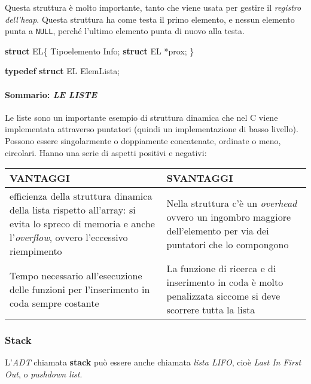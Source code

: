 \documentclass[
]{article}
\newenvironment{Shaded}{}{}
\newcommand{\KeywordTok}[1]{\textcolor[rgb]{0.00,0.44,0.13}{\textbf{#1}}}
\newcommand{\NormalTok}[1]{#1}
\begin{document}
Questa struttura è molto importante, tanto che viene usata per gestire
il \emph{registro dell'heap}. Questa struttura ha come testa il primo
elemento, e nessun elemento punta a \texttt{NULL}, perché l'ultimo
elemento punta di nuovo alla testa.

\begin{Shaded}
\begin{Highlighting}[]
\KeywordTok{struct}\NormalTok{ EL\{}
\NormalTok{    Tipoelemento Info;}
    \KeywordTok{struct}\NormalTok{ EL *prox;}
\NormalTok{\}}

\KeywordTok{typedef} \KeywordTok{struct}\NormalTok{ EL ElemLista;}
\end{Highlighting}
\end{Shaded}

\hypertarget{header-n1305}{%
\paragraph{\texorpdfstring{Sommario: \emph{LE
LISTE}}{Sommario: LE LISTE}}\label{header-n1305}}

Le liste sono un importante esempio di struttura dinamica che nel C
viene implementata attraverso puntatori (quindi un implementazione di
basso livello). Possono essere singolarmente o doppiamente concatenate,
ordinate o meno, circolari. Hanno una serie di aspetti positivi e
negativi:

\begin{longtable}[]{@{}ll@{}}
\toprule
VANTAGGI & SVANTAGGI\tabularnewline
\midrule
\endhead
efficienza della struttura dinamica della lista rispetto all'array: si
evita lo spreco di memoria e anche l'\emph{overflow}, ovvero l'eccessivo
riempimento & Nella struttura c'è un \emph{overhead} ovvero un ingombro
maggiore dell'elemento per via dei puntatori che lo
compongono\tabularnewline
Tempo necessario all'esecuzione delle funzioni per l'inserimento in coda
sempre costante & La funzione di ricerca e di inserimento in coda è
molto penalizzata siccome si deve scorrere tutta la lista\tabularnewline
\bottomrule
\end{longtable}

\hypertarget{header-n1318}{%
\subsubsection{Stack}\label{header-n1318}}

L'\emph{ADT} chiamata \textbf{stack} può essere anche chiamata
\emph{lista LIFO}, cioè \emph{Last In First Out}, o \emph{pushdown
list}.
\end{document}
